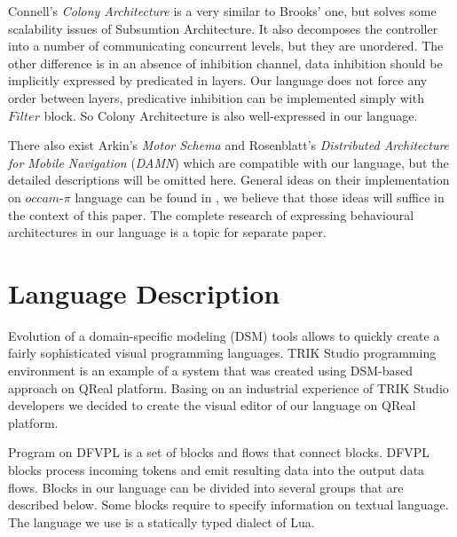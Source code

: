 \documentclass[conference,compsoc]{IEEEtran}
\begin{document}
Connell's \textit{Colony Architecture}\cite{connell1989colony} is a very similar to Brooks' one, but solves some scalability issues of Subsumtion Architecture. It also decomposes the controller into a number of communicating concurrent levels, but they are unordered. The other difference is in an absence of inhibition channel, data inhibition should be implicitly expressed by predicated in layers. Our language does not force any order between layers, predicative inhibition can be implemented simply with $Filter$ block. So Colony Architecture is also well-expressed in our language.

There also exist Arkin’s \textit{Motor Schema}\cite{arkin1987motor} and Rosenblatt’s \textit{Distributed Architecture for Mobile Navigation} (\textit{DAMN})\cite{rosenblatt1997damn} which are compatible with our language, but the detailed descriptions will be omitted here. General ideas on their implementation on $occam\mbox{-}\pi$ language can be found in \cite{simpson2009toward}, we believe that those ideas will suffice in the context of this paper. The complete research of expressing behavioural architectures in our language is a topic for separate paper.


\section{Language Description}
\label{sec:lang}

Evolution of a domain-specific modeling (DSM) tools allows to quickly create a fairly sophisticated visual programming languages\cite{DSM}. TRIK Studio programming environment is an example of a system that was created using DSM-based approach on QReal platform\cite{qrealMeta, kuzenkova2013qreal}. Basing on an industrial experience of TRIK Studio developers we decided to create the visual editor of our language on QReal platform.

Program on DFVPL is a set of blocks and flows that connect blocks. DFVPL blocks process incoming tokens and emit resulting data into the output data flows. Blocks in our language can be divided into several groups that are described below. Some blocks require to specify information on textual language. The language we use is a statically typed dialect of Lua\cite{lua}.
\end{document}
